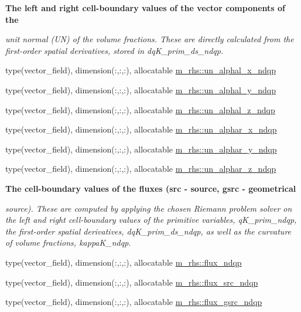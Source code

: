 \begin{Indent}\textbf{ The left and right cell-\/boundary values of the vector components of the}\par
{\em unit normal (UN) of the volume fractions. These are directly calculated from the first-\/order spatial derivatives, stored in dq\+K\+\_\+prim\+\_\+ds\+\_\+ndqp. }\begin{DoxyCompactItemize}
\item 
type(vector\+\_\+field), dimension(\+:,\+:,\+:), allocatable \hyperlink{namespacem__rhs_ab49ec164612765d8947ccf4250dd0fb0}{m\+\_\+rhs\+::un\+\_\+alphal\+\_\+x\+\_\+ndqp}
\item 
type(vector\+\_\+field), dimension(\+:,\+:,\+:), allocatable \hyperlink{namespacem__rhs_ab99096402fadc8b539f8a031dfdb3ffe}{m\+\_\+rhs\+::un\+\_\+alphal\+\_\+y\+\_\+ndqp}
\item 
type(vector\+\_\+field), dimension(\+:,\+:,\+:), allocatable \hyperlink{namespacem__rhs_a3a70e0b6fb4faaa4800bf2a7aa2519af}{m\+\_\+rhs\+::un\+\_\+alphal\+\_\+z\+\_\+ndqp}
\item 
type(vector\+\_\+field), dimension(\+:,\+:,\+:), allocatable \hyperlink{namespacem__rhs_aca82442008ec6a9c478cdfa1b67b7e40}{m\+\_\+rhs\+::un\+\_\+alphar\+\_\+x\+\_\+ndqp}
\item 
type(vector\+\_\+field), dimension(\+:,\+:,\+:), allocatable \hyperlink{namespacem__rhs_a2b31029abb8eed5463485244c8029420}{m\+\_\+rhs\+::un\+\_\+alphar\+\_\+y\+\_\+ndqp}
\item 
type(vector\+\_\+field), dimension(\+:,\+:,\+:), allocatable \hyperlink{namespacem__rhs_a9a204df83f1d0c0ce63177fbc33e1f76}{m\+\_\+rhs\+::un\+\_\+alphar\+\_\+z\+\_\+ndqp}
\end{DoxyCompactItemize}
\end{Indent}
\begin{Indent}\textbf{ The cell-\/boundary values of the fluxes (src -\/ source, gsrc -\/ geometrical}\par
{\em source). These are computed by applying the chosen Riemann problem solver on the left and right cell-\/boundary values of the primitive variables, q\+K\+\_\+prim\+\_\+ndqp, the first-\/order spatial derivatives, dq\+K\+\_\+prim\+\_\+ds\+\_\+ndqp, as well as the curvature of volume fractions, kappa\+K\+\_\+ndqp. }\begin{DoxyCompactItemize}
\item 
type(vector\+\_\+field), dimension(\+:,\+:,\+:), allocatable \hyperlink{namespacem__rhs_a10d1ea6f5c8a0d7137be28b1e8c4780f}{m\+\_\+rhs\+::flux\+\_\+ndqp}
\item 
type(vector\+\_\+field), dimension(\+:,\+:,\+:), allocatable \hyperlink{namespacem__rhs_aec977e848537c8ecd3317aefd2bd8607}{m\+\_\+rhs\+::flux\+\_\+src\+\_\+ndqp}
\item 
type(vector\+\_\+field), dimension(\+:,\+:,\+:), allocatable \hyperlink{namespacem__rhs_a5542f5954178123cbe052df43d09dc38}{m\+\_\+rhs\+::flux\+\_\+gsrc\+\_\+ndqp}
\end{DoxyCompactItemize}
\end{Indent}
